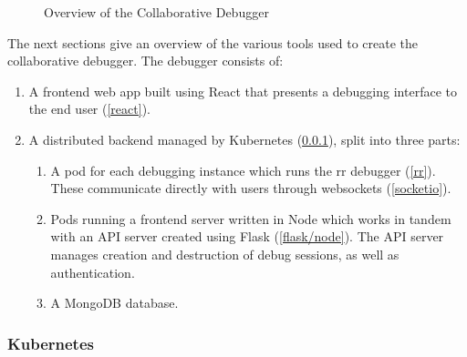\documentclass[12pt]{article}
\begin{document}
\begin{figure}[h!]




  \caption{Overview of the Collaborative Debugger}
  \label{debugger:overview}
\end{figure}

The next sections give an overview of the various tools used to create
the collaborative debugger.  The debugger consists of:

\begin{enumerate}
\item A frontend web app built using React that presents a debugging
  interface to the end user (\ref{react}).
\item A distributed backend managed by Kubernetes (\ref{k8s}), split into three parts:
  \begin{enumerate}
  \item A pod for each debugging instance which runs the rr debugger
    (\ref{rr}).  These communicate directly with users through
    websockets (\ref{socketio}).
  \item Pods running a frontend server written in Node which works in
    tandem with an API server created using Flask (\ref{flask/node}).
    The API server manages creation and destruction of debug sessions,
    as well as authentication.
  \item A MongoDB database.
  \end{enumerate}
\end{enumerate}

\subsubsection{Kubernetes}\label{k8s}
\end{document}

